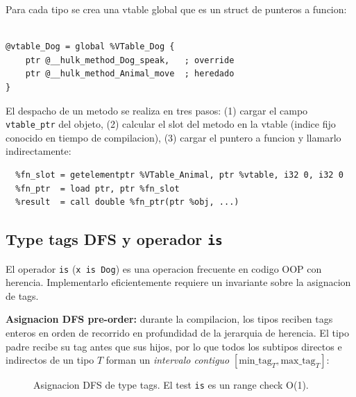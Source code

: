 \documentclass[12pt,a4paper]{article}
\begin{document}
Para cada tipo se crea una vtable global que es un struct de punteros a funcion:

\begin{lstlisting}[style=llvmir, caption={Vtable de un tipo Dog que hereda de Animal}]
%VTable_Dog = type { ptr, ptr }  ; [speak, move]

@vtable_Dog = global %VTable_Dog {
    ptr @__hulk_method_Dog_speak,   ; override
    ptr @__hulk_method_Animal_move  ; heredado
}
\end{lstlisting}

El despacho de un metodo se realiza en tres pasos: (1) cargar el campo
\texttt{vtable\_ptr} del objeto, (2) calcular el slot del metodo en la vtable
(indice fijo conocido en tiempo de compilacion), (3) cargar el puntero a funcion
y llamarlo indirectamente:

\begin{lstlisting}[style=llvmir, caption={Despacho virtual de animal.speak()}]
  %vtable = load ptr, ptr %vtable_field
  %fn_slot = getelementptr %VTable_Animal, ptr %vtable, i32 0, i32 0
  %fn_ptr  = load ptr, ptr %fn_slot
  %result  = call double %fn_ptr(ptr %obj, ...)
\end{lstlisting}

\subsection{Type tags DFS y operador \texttt{is}}

El operador \texttt{is} (\texttt{x is Dog}) es una operacion frecuente en codigo OOP
con herencia. Implementarlo eficientemente requiere un invariante sobre la asignacion
de tags.

\textbf{Asignacion DFS pre-order:} durante la compilacion, los tipos reciben tags
enteros en orden de recorrido en profundidad de la jerarquia de herencia. El tipo padre
recibe su tag antes que sus hijos, por lo que todos los subtipos directos e indirectos
de un tipo $T$ forman un \textit{intervalo contiguo} $[\text{min\_tag}_T, \text{max\_tag}_T]$:

\begin{figure}[H]
\centering
{}
\caption{Asignacion DFS de type tags. El test \texttt{is} es un range check O(1).}
\end{figure}
\end{document}
